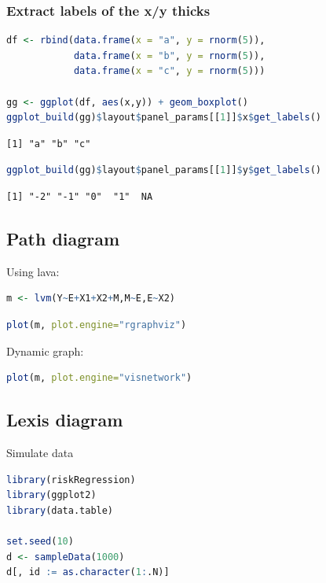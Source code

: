 \documentclass{article}
\begin{document}
\subsubsection{Extract labels of the x/y thicks}
\label{sec:orgecc54f9}

\begin{lstlisting}[language=r,numbers=none]
df <- rbind(data.frame(x = "a", y = rnorm(5)),
            data.frame(x = "b", y = rnorm(5)),
            data.frame(x = "c", y = rnorm(5)))

gg <- ggplot(df, aes(x,y)) + geom_boxplot()
ggplot_build(gg)$layout$panel_params[[1]]$x$get_labels()
\end{lstlisting}

\label{}
\begin{verbatim}
[1] "a" "b" "c"
\end{verbatim}


\begin{lstlisting}[language=r,numbers=none]
ggplot_build(gg)$layout$panel_params[[1]]$y$get_labels()
\end{lstlisting}

\label{}
\begin{verbatim}
[1] "-2" "-1" "0"  "1"  NA
\end{verbatim}


\clearpage
\subsection{Path diagram}
\label{sec:org0c09e86}
Using lava:
\begin{lstlisting}[language=r,numbers=none]
m <- lvm(Y~E+X1+X2+M,M~E,E~X2)
\end{lstlisting}

\begin{lstlisting}[language=r,numbers=none]
plot(m, plot.engine="rgraphviz") 
\end{lstlisting}

Dynamic graph:
\begin{lstlisting}[language=r,numbers=none]
plot(m, plot.engine="visnetwork")
\end{lstlisting}
\subsection{Lexis diagram}
\label{sec:orged710c7}

Simulate data
\begin{lstlisting}[language=r,numbers=none]
library(riskRegression)
library(ggplot2)
library(data.table)

set.seed(10)
d <- sampleData(1000)
d[, id := as.character(1:.N)]
\end{lstlisting}
\end{document}
